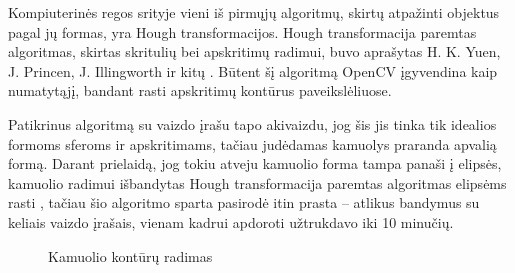 \documentclass{VUMIFPSbakalaurinis}
\begin{document}
Kompiuterinės regos srityje vieni iš pirmųjų algoritmų, skirtų atpažinti objektus pagal jų formas, yra Hough transformacijos.
Hough transformacija paremtas algoritmas, skirtas skritulių bei apskritimų radimui, buvo aprašytas H. K. Yuen, J. Princen, J. Illingworth ir kitų \cite{YUEN199071}. Būtent šį algoritmą OpenCV įgyvendina kaip numatytąjį, bandant rasti apskritimų kontūrus paveikslėliuose.

Patikrinus algoritmą su vaizdo įrašu tapo akivaizdu, jog šis jis tinka tik idealios formoms sferoms ir apskritimams, tačiau judėdamas kamuolys praranda apvalią formą. Darant prielaidą, jog tokiu atveju kamuolio forma tampa panaši į elipsės, kamuolio radimui išbandytas Hough transformacija paremtas algoritmas elipsėms rasti \cite{1048464}, tačiau šio algoritmo sparta pasirodė itin prasta – atlikus bandymus su keliais vaizdo įrašais, vienam kadrui apdoroti užtrukdavo iki 10 minučių.

\begin{figure}[H]
	\centering
	\qquad
	\caption{Kamuolio kontūrų radimas}
	\label{fig:contours}
\end{figure}
\end{document}
